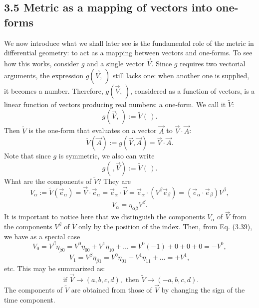 \documentclass[12pt]{book}
\begin{document}
    \subsection{3.5 Metric as a mapping of vectors into one-forms}
    We now introduce what we shall later see is the fundamental role of the metric in differential geometry: to act as a mapping between vectors and one-forms. To see how this works, consider \(g\) and a single vector \(\vec{V}\). Since \(g\) requires two vectorial arguments, the expression \(g(\vec{V}, \,)\) still lacks one: when another one is supplied, it becomes a number. Therefore, \(g(\vec{V}, \,)\), considered as a function of vectors, is a linear function of vectors producing real numbers: a one-form. We call it \(\tilde{V}\):
    \[
    g(\vec{V}, \,) := \tilde{V}( \,). \tag{3.37}
    \]
    Then \(\tilde{V}\) is the one-form that evaluates on a vector \(\vec{A}\) to \(\vec{V} \cdot \vec{A}\):
    \[
    \tilde{V}(\vec{A}) := g(\vec{V},\vec{A}) = \vec{V} \cdot \vec{A}. \tag{3.38}
    \]
    Note that since \(g\) is symmetric, we also can write
    \[
    g( \,, \vec{V}) := \tilde{V}( \,).
    \]
    What are the components of \(\tilde{V}\)? They are
    \[
    V_\alpha := \tilde{V}(\vec{e}_\alpha) = \vec{V} \cdot \vec{e}_\alpha = \vec{e}_\alpha \cdot \vec{V}
    = \vec{e}_\alpha \cdot (V^\beta \vec{e}_\beta)
    = (\vec{e}_\alpha \cdot \vec{e}_\beta)V^\beta,
    \]
    \[
    V_\alpha = \eta_{\alpha\beta}V^\beta. \tag{3.39}
    \]
    It is important to notice here that we distinguish the components \(V_\alpha\) of \(\vec{V}\) from the components \(V^\beta\) of \(\tilde{V}\) only by the position of the index. Then, from Eq. (3.39), we have as a special case
    \[
    V_0 = V^\beta \eta_{\beta 0} = V^0 \eta_{00} + V^1 \eta_{10} + \dots 
    = V^0(-1) + 0 + 0 + 0 
    = -V^0, \tag{3.40}
    \]
    \[
    V_1 = V^\beta \eta_{\beta 1} = V^0 \eta_{01} + V^1 \eta_{11} + \dots 
    = +V^1, \tag{3.41}
    \]
    etc. This may be summarized as: 
    \[
    \text{ if } \vec{V} \rightarrow (a, b, c, d),
    \text{ then } \tilde{V} \rightarrow (-a, b, c, d). \tag{3.42}
    \]
    The components of \(\tilde{V}\) are obtained from those of \(\vec{V}\) by changing the sign of the time component. 
    
\end{document}
